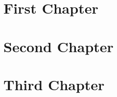\documentclass[12pt,openany,oneside]{book}
\begin{document}
\chapter{First Chapter}
\lipsum[1-10]

\chapter{Second Chapter}
\lipsum[1-10]

\chapter{Third Chapter}
\lipsum[1-10]
\end{document}
